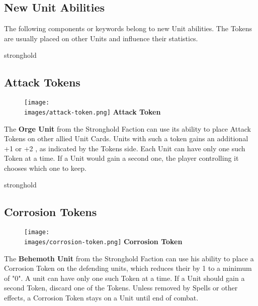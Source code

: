 \begin{multicols*}{2}

\subsection*{New Unit Abilities}
The following components or keywords belong to new Unit abilities. The Tokens are usually placed on other Units and influence their statistics.


\begin{expansion}{stronghold}
	\subsection*{Attack Tokens}
	\setlength\intextsep{0pt}
    \setlength\columnsep{1em}
    \begin{wrapfigure}{r}{0.2\linewidth}
        \texttt{[image: \\images/attack-token.png]}
        \centering\textbf{\scriptsize\color{darkcandyapplered}Attack \mbox{Token}\\}
    \end{wrapfigure}
    The \textbf{Orge Unit} from the Stronghold Faction can use its  ability to place Attack Tokens on other allied Unit Cards.
    Units with such a token gains an additional +1  or +2 , as indicated by the Tokens side.
    Each Unit can have only one such Token at a time.
    If a Unit would gain a second one, the player controlling it chooses which one to keep.
\end{expansion}
\vspace*{1em}

\begin{expansion}{stronghold}
	\subsection*{Corrosion Tokens}
	\setlength\intextsep{0pt}
    \setlength\columnsep{1em}
    \begin{wrapfigure}{r}{0.2\linewidth}
        \texttt{[image: \\images/corrosion-token.png]}
        \centering\textbf{\scriptsize\color{darkcandyapplered}Corrosion \mbox{Token}\\}
    \end{wrapfigure}The \textbf{Behemoth Unit} from the Stronghold Faction can use his  ability to place a Corrosion Token on the defending units, which reduces their  by 1 to a minimum of "0". A unit can have only one such Token at a time.
	If a Unit should gain a second Token, discard one of the Tokens. Unless removed by Spells or other effects, a Corrosion Token stays on a Unit until end of combat.
\end{expansion}


\end{multicols*}
